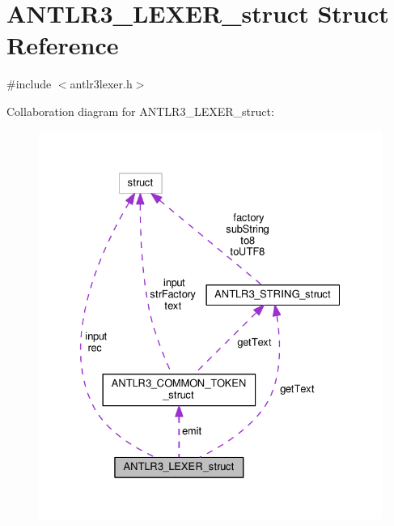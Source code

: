 \hypertarget{struct_a_n_t_l_r3___l_e_x_e_r__struct}{\section{A\-N\-T\-L\-R3\-\_\-\-L\-E\-X\-E\-R\-\_\-struct Struct Reference}
\label{struct_a_n_t_l_r3___l_e_x_e_r__struct}
}


{\ttfamily \#include $<$antlr3lexer.\-h$>$}



Collaboration diagram for A\-N\-T\-L\-R3\-\_\-\-L\-E\-X\-E\-R\-\_\-struct\-:
\nopagebreak
\begin{figure}[H]
\begin{center}
\leavevmode
\includegraphics[width=329pt]{struct_a_n_t_l_r3___l_e_x_e_r__struct__coll__graph}
\end{center}
\end{figure}
